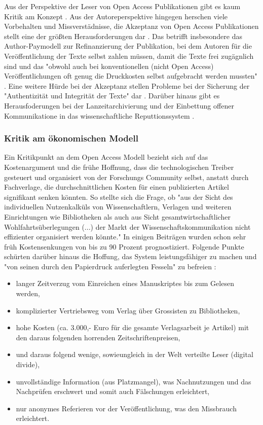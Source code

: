 Aus der Perspektive der Leser von Open Access Publikationen gibt es kaum Kritik am Konzept \cite{weishaupt_2009_goldenOA}. Aus der Autoreperspektive hingegen herschen viele Vorbehalten und Missverstädnisse, die Akzeptanz von Open Access Publikationen stellt eine der größten Herausforderungen dar \cite{weishaupt_2009_goldenOA} \cite{Suber_2002}. Das betrifft insbesondere das Author-Paymodell zur Refinanzierung der Publikation, bei dem Autoren für die Veröffentlichung der Texte selbst zahlen müssen, damit die Texte frei zugägnlich sind \cite{suchen} und das "obwohl auch bei konventionellen (nicht Open Access) Veröffentlichungen oft genug die Druckkosten selbst aufgebracht werden mussten" \cite{weishaupt_2009_goldenOA}. Eine weitere Hürde bei der Akzeptanz stellen Probleme bei der Sicherung der "Authentizität und Integrität der Texte" dar \cite{weishaupt_2009_goldenOA}. Darüber hinaus gibt es Herausfoderungen bei der Lanzeitarchivierung und der Einbettung offener Kommunikatione in das wissenschaftliche Reputtionssystem \cite{weishaupt_2009_goldenOA} \cite{Suber_2002} \cite{Adema_2014_open_access}.

\subsubsection{Kritik am ökonomischen Modell}

Ein Kritikpunkt an dem Open Access Modell bezieht sich auf das Kostenargument und die frühe Hoffnung, dass die technologischen Treiber gesteuert und organisiert von der Forschungs Community selbst, anstatt durch Fachverlage, die durchschnittlichen Kosten für einen publizierten Artikel signifikant senken könnten. So stellte sich die Frage, ob
"aus der Sicht des individuellen Nutzenkalküls von Wissenschaftlern, Verlagen und weiteren Einrichtungen wie Bibliotheken als auch aus Sicht gesamtwirtschaftlicher Wohlfahrtsüberlegungen (...) der Markt der Wissenschaftskommunikation nicht effizienter organisiert werden könnte."\cite{Hess_2006} In einigen Beiträgen wurden schon sehr früh Kostensenkungen von bis zu 90 Prozent \cite{hilf_2004} \cite{suchen} prognostiziert. Folgende Punkte schürten darüber hinaus die Hoffung, das System leistungsfähiger zu machen und "von seinen durch den Papierdruck auferlegten Fesseln" zu befreien \cite{hilf_2004}:
\begin{itemize}
\item langer Zeitverzug vom Einreichen eines Manuskriptes bis zum Gelesen werden,
\item komplizierter Vertriebsweg vom Verlag über Grossisten zu Bibliotheken,
\item hohe Kosten (ca. 3.000,- Euro für die gesamte Verlagsarbeit je Artikel) mit den daraus folgenden horrenden Zeitschriftenpreisen,
\item und daraus folgend wenige, sowieungleich in der Welt verteilte Leser (digital divide),
\item unvollständige Information (aus Platzmangel), was Nachnutzungen und das Nachprüfen erschwert und somit auch Fälschungen erleichtert,
\item nur anonymes Referieren vor der Veröffentlichung, was den Missbrauch erleichtert. 
\end{itemize}

